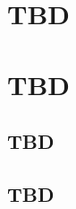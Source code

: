 \section{TBD}
\label{sec:Wald_08.2}


\section{TBD}
\label{sec:Wald_08.3}

\subsection{TBD}
\label{subsec:Wald_08.3.1}

\subsection{TBD}
\label{subsec:Wald_08.3.2}